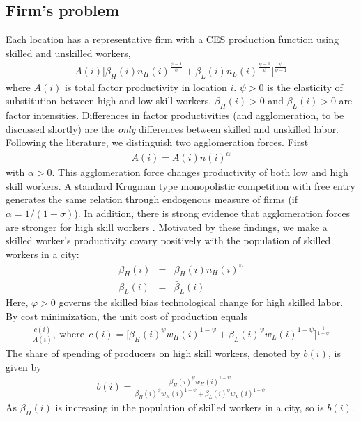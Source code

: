 \documentclass[12 pt]{article}
\begin{document}
\subsection{Firm's problem}
Each location has a representative firm with a CES production function using skilled and unskilled workers,
\begin{eqnarray}
	 A(i)\Big[ \beta_H(i) n_H(i)^{\frac{\psi-1}{\psi}} + \beta_L(i) n_L(i)^{\frac{\psi-1}{\psi}} \Big]^{\frac{\psi}{\psi-1}} \nonumber
\end{eqnarray}
where $A(i)$ is total factor productivity in location $i$. $\psi>0$ is the elasticity of substitution between high and low skill workers. $\beta_H(i)>0$ and $\beta_L(i)>0$ are factor intensities. Differences in factor productivities (and agglomeration, to be discussed shortly) are the \textit{only} differences between skilled and unskilled labor. 
Following the literature, we distinguish two agglomeration forces. First 
\begin{eqnarray}\label{eq:agglom_general}
A(i) = \bar{A}(i) n(i)^{\alpha}
\end{eqnarray}
with $\alpha>0$. This agglomeration force changes productivity of both low and high skill workers. A standard Krugman type monopolistic competition with free entry generates the same relation through endogenous measure of firms (if $\alpha=1/(1+\sigma)$). In addition, there is strong evidence that agglomeration forces are stronger for high skill workers \citep{glaeser2010complementarity}.  Motivated by these findings, we make a skilled worker's productivity covary positively with the population of skilled workers in a city:
\begin{eqnarray}\label{eq:agglom_specific}
	\beta_H(i) & = & \bar{\beta}_H(i) n_H(i)^{\varphi} \nonumber \\
	\beta_L(i) & = & \bar{\beta}_L(i)
\end{eqnarray}
Here, $\varphi>0$ governs the skilled bias technological change for high skilled labor.
By cost minimization, the unit cost of production equals
\begin{eqnarray}\label{eq:unit_cost}
    \frac{c(i)}{A(i)} ,~\mbox{where}~~c(i)=\Big[ \beta_H(i)^{\psi} w_H(i)^{1-\psi} + \beta_L(i)^{\psi} w_L(i)^{1-\psi}\Big]^{\frac{1}{1-\psi}}
\end{eqnarray}
The share of spending of producers on high skill workers, denoted by $b(i)$, is given by
\begin{eqnarray}\label{eq:input_share}
	b(i) = \frac{\beta_H(i)^{\psi} w_H(i)^{1-\psi}}{\beta_H(i)^{\psi} w_H(i)^{1-\psi} + \beta_L(i)^{\psi} w_L(i)^{1-\psi}}
\end{eqnarray}
As $\beta_H(i)$ is increasing in the population of skilled workers in a city, so is $b(i)$.
\end{document}
